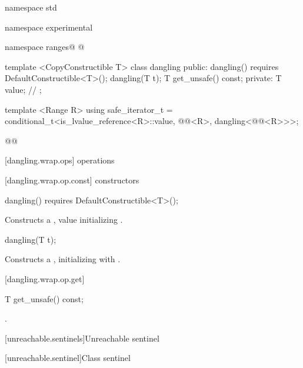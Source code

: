 \begin{addedblock}
\begin{codeblock}
namespace std { namespace experimental { namespace ranges@ @ {
  template <CopyConstructible T>
  class dangling {
  public:
    dangling() requires DefaultConstructible<T>();
    dangling(T t);
    T get_unsafe() const;
  private:
    T value; // \expos
  };

  template <Range R>
  using safe_iterator_t =
    conditional_t<is_lvalue_reference<R>::value,
      @@<R>,
      dangling<@@<R>>>;
}}}@\newtxt{\}}@
\end{codeblock}

[dangling.wrap.ops]{ operations}

[dangling.wrap.op.const]{ constructors}

%
\begin{itemdecl}
dangling() requires DefaultConstructible<T>();
\end{itemdecl}

\begin{itemdescr}
\pnum
\effects Constructs a , value initializing .
\end{itemdescr}

%
\begin{itemdecl}
dangling(T t);
\end{itemdecl}

\begin{itemdescr}
\pnum
\effects Constructs a , initializing  with .
\end{itemdescr}

[dangling.wrap.op.get]{}

%
%
\begin{itemdecl}
T get_unsafe() const;
\end{itemdecl}

\begin{itemdescr}
\pnum
\returns {}.
\end{itemdescr}

[unreachable.sentinels]{Unreachable sentinel}

[unreachable.sentinel]{Class  sentinel}


\end{addedblock}
